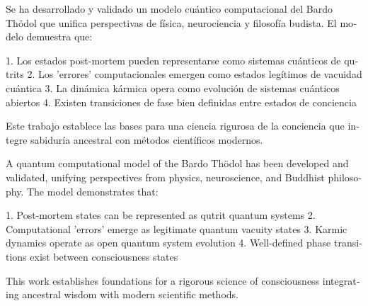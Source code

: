\documentclass[12pt,a4paper]{article}
\begin{document}
\begin{otherlanguage}{spanish}
Se ha desarrollado y validado un modelo cuántico computacional del Bardo Thödol que unifica perspectivas de física, neurociencia y filosofía budista. El modelo demuestra que:

1. Los estados post-mortem pueden representarse como sistemas cuánticos de qutrits
2. Los 'errores' computacionales emergen como estados legítimos de vacuidad cuántica
3. La dinámica kármica opera como evolución de sistemas cuánticos abiertos
4. Existen transiciones de fase bien definidas entre estados de conciencia

Este trabajo establece las bases para una ciencia rigurosa de la conciencia que integre sabiduría ancestral con métodos científicos modernos.
\end{otherlanguage}

\begin{otherlanguage}{english}
A quantum computational model of the Bardo Thödol has been developed and validated, unifying perspectives from physics, neuroscience, and Buddhist philosophy. The model demonstrates that:

1. Post-mortem states can be represented as qutrit quantum systems
2. Computational 'errors' emerge as legitimate quantum vacuity states
3. Karmic dynamics operate as open quantum system evolution
4. Well-defined phase transitions exist between consciousness states

This work establishes foundations for a rigorous science of consciousness integrating ancestral wisdom with modern scientific methods.
\end{otherlanguage}

\printbibliography
\end{document}
